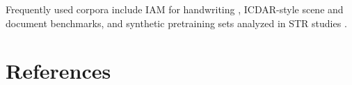 \documentclass[11pt, a4paper]{article}
\begin{document}
Frequently used corpora include IAM for handwriting \cite{marti2002iam}, ICDAR-style scene and document benchmarks, and synthetic pretraining sets analyzed in STR studies \cite{baek2019str,li2021trba}.



\section{References}

\printbibliography[heading=none]
\end{document}
